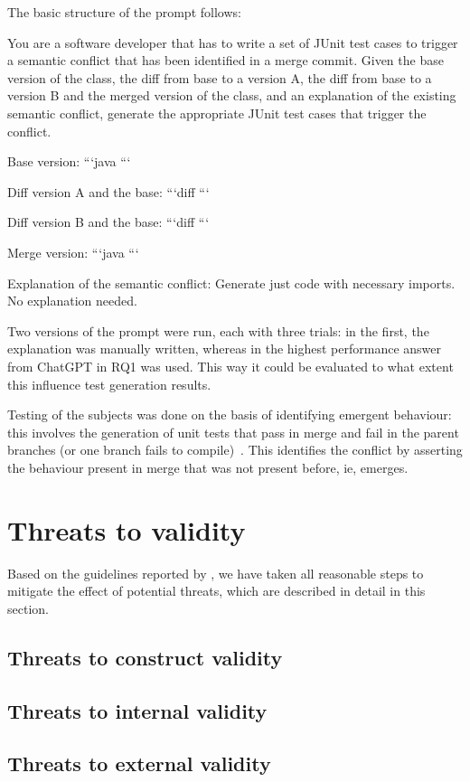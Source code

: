 The basic structure of the prompt follows:
\begin{prompt}
You are a software developer that has to write a set of JUnit test cases to trigger a semantic conflict that has been identified in a merge commit. 
Given the base version of the class, the diff from base to a version A, the diff from base to a version B and the merged version of the class, and an explanation of the existing semantic conflict, generate the appropriate JUnit test cases that trigger the conflict.

Base version:
```java
```

Diff version A and the base:
```diff
```

Diff version B and the base:
```diff
```

Merge version:
```java
```

Explanation of the semantic conflict:
Generate just code with necessary imports. No explanation needed.  
\end{prompt}
Two versions of the prompt were run, each with three trials: in the first, the explanation was manually written, whereas in the highest performance answer from ChatGPT in RQ1 was used.
This way it could be evaluated to what extent this influence test generation results.

Testing of the subjects was done on the basis of identifying emergent behaviour: this involves the generation of unit tests that 
pass in merge and fail in the parent branches (or one branch fails to compile)~\citet{kn:nuno}. This identifies the conflict by
asserting the behaviour present in merge that was not present before, ie, emerges.

\section{Threats to validity}


Based on the guidelines reported by \citet{wohlin2012experimentation}, we have
taken all reasonable steps to mitigate the effect of potential threats, which
are described in detail in this section.

\subsection{Threats to construct validity}
%

\subsection{Threats to internal validity}
%

\subsection{Threats to external validity}
%
